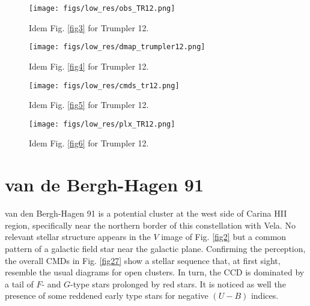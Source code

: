 \documentclass{aa}
\begin{document}
\begin{figure*}[ht]
    \centering
    \texttt{[image: figs/low\_res/obs\_TR12.png]}
    \caption{Idem Fig. \ref{fig3} for Trumpler 12.}
    \label{fig19}
\end{figure*}
\begin{figure*}[ht]
    \centering
    \texttt{[image: figs/low\_res/dmap\_trumpler12.png]}
    \caption{Idem Fig. \ref{fig4} for Trumpler 12.}
    \label{fig20}
\end{figure*}
\begin{figure*}[ht]
    \centering
    \texttt{[image: figs/low\_res/cmds\_tr12.png]}
    \caption{Idem Fig. \ref{fig5} for Trumpler 12.}
    \label{fig21}
\end{figure*}
\begin{figure*}[ht]
    \centering
    \texttt{[image: figs/low\_res/plx\_TR12.png]}
    \caption{Idem Fig. \ref{fig6} for Trumpler 12.}
    \label{fig22}
\end{figure*}



\section{van de Bergh-Hagen 91}

van den Bergh-Hagen 91 is a potential cluster at the west side of Carina HII
region, specifically near the northern border of this constellation with Vela.
No relevant stellar structure appears in the $V$ image of Fig. \ref{fig2} but a
common pattern of a galactic field star near the galactic plane. Confirming the
perception, the overall CMDs in Fig. \ref{fig27} show a stellar sequence that,
at first sight, resemble the usual diagrams for open clusters. In turn, the CCD
is dominated by a tail of $F$- and $G$-type stars prolonged by red stars. It is
noticed as well the presence of some reddened early type stars for negative
$(U-B)$ indices.\\
\end{document}
